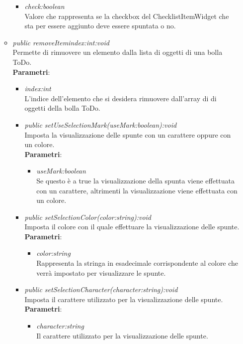 \begin{itemize}
\begin{itemize}
\begin{itemize}
\item \textit{check:boolean}\\
Valore che rappresenta se la checkbox del ChecklistItemWidget che sta per essere aggiunto deve essere spuntata o no.
\end{itemize}
\item \textit{public removeItem{index:int}:void}\\
Permette di rimuovere un elemento dalla lista di oggetti di una bolla ToDo.
\\ \textbf{Parametri}: \begin{itemize}
\item \textit{index:int}\\
L'indice dell'elemento che si desidera rimuovere dall'array di di oggetti della bolla ToDo.
\item \textit{public setUseSelectionMark(useMark:boolean):void}\\
	Imposta la visualizzazione delle spunte con un carattere oppure con un colore.
		\\ \textbf{Parametri}: \begin{itemize}
		\item \textit{useMark:boolean}\\
		Se questo è a true la visualizzazione della spunta viene effettuata con un carattere, altrimenti la visualizzazione viene effettuata con un colore.
		\end{itemize}  
\item \textit{public setSelectionColor(color:string):void}\\
	Imposta il colore con il quale effettuare la visualizzazione delle spunte.
		\\ \textbf{Parametri}: \begin{itemize}
		\item \textit{color:string}\\
		Rappresenta la stringa in esadecimale corrispondente al colore che verrà impostato per visualizzare le spunte.
		\end{itemize}  
\item \textit{public setSelectionCharacter(character:string):void}\\
	Imposta il carattere utilizzato per la visualizzazione delle spunte.
		\\ \textbf{Parametri}: \begin{itemize}
		\item \textit{character:string}\\
		Il carattere utilizzato per la visualizzazione delle spunte.

\end{itemize}
\end{itemize}
\end{itemize}
\end{itemize}
